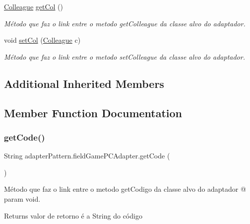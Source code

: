 \begin{DoxyCompactItemize}
\mbox{\hyperlink{classmediator_pattern_1_1_colleague}{Colleague}} \mbox{\hyperlink{classadapter_pattern_1_1field_game_p_c_adapter_a6f4f583609bc9bbef0de01f0b845f208}{get\+Col}} ()
\begin{DoxyCompactList}\small\item\em Método que faz o link entre o metodo get\+Colleague da classe alvo do adaptador. \end{DoxyCompactList}\item 
void \mbox{\hyperlink{classadapter_pattern_1_1field_game_p_c_adapter_a628eaa84c2864e5a3965a713665bd802}{set\+Col}} (\mbox{\hyperlink{classmediator_pattern_1_1_colleague}{Colleague}} c)
\begin{DoxyCompactList}\small\item\em Método que faz o link entre o metodo set\+Colleague da classe alvo do adaptador. \end{DoxyCompactList}\end{DoxyCompactItemize}
\subsection*{Additional Inherited Members}


\subsection{Member Function Documentation}
\mbox{\label{classadapter_pattern_1_1field_game_p_c_adapter_ae8d757e3ba8fcc7cb9e69def87ebf9be}} 
\subsubsection{\texorpdfstring{getCode()}{getCode()}}
{\footnotesize\ttfamily String adapter\+Pattern.\+field\+Game\+P\+C\+Adapter.\+get\+Code (\begin{DoxyParamCaption}{ }\end{DoxyParamCaption})}



Método que faz o link entre o metodo get\+Codigo da classe alvo do adaptador @ param void. 

\begin{DoxyReturn}{Returns}
valor de retorno é a String do código 
\end{DoxyReturn}


